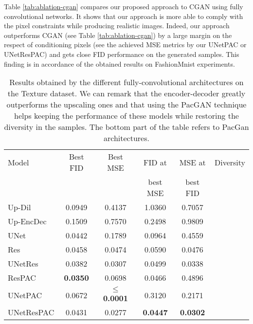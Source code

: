 Table \ref{tab:ablation-cgan} compares our proposed approach to CGAN using fully convolutional networks. It shows that our approach is more able to comply with the pixel constraints while producing realistic images. Indeed, our approach outperforms CGAN (see Table \ref{tab:ablation-cgan}) by a large margin on the respect of conditioning pixels (see the achieved MSE metrics by  our UNetPAC or UNetResPAC)  and gets  close FID performance on the generated samples. This finding is in accordance of the obtained results on FashionMnist experiments.

\begin{table}
	\centering
	\begin{tabular}{|l|c|c|c|c|c|}
		\hline
		Model           & Best FID & Best MSE & FID at & MSE at & Diversity\\
		&&&best MSE & best FID & \\
		\hline
		Up-Dil      & 0.0949 & 0.4137 & 1.0360 & 0.7057 & {\color{green}\cmark } \\
		Up-EncDec  & 0.1509 & 0.7570 & 0.2498 & 0.9809 & {\color{green}\cmark } \\
		UNet        & 0.0442 & 0.1789 & 0.0964 & 0.4559 & {\color{red}\xmark } \\
		Res      & 0.0458 & 0.0474 & 0.0590 & 0.0476 & {\color{red}\xmark } \\
		UNetRes & 0.0382 & 0.0307 & 0.0499 & 0.0338 & {\color{red}\xmark } \\
		\hline
		ResPAC &  \textbf{0.0350} & 0.0698 & 0.0466 & 0.4896 & {\color{green}\cmark } \\
		UNetPAC &  0.0672 & \textbf{$\leq$ 0.0001} & 0.3120 & 0.2171&  {\color{green}\cmark } \\
		UNetResPAC & 0.0431 & 0.0277 & \textbf{0.0447} & \textbf{0.0302} &  {\color{green}\cmark }\\
		\hline
	\end{tabular}
	
	\caption{Results obtained by the different fully-convolutional architectures on the Texture dataset. We can remark that the encoder-decoder greatly outperforms the upscaling ones and that using the PacGAN technique helps keeping the performance of these models while restoring the diversity in the samples. The bottom part of the table refers to PacGan architectures.}
	\label{tab:ablation}
\end{table}

